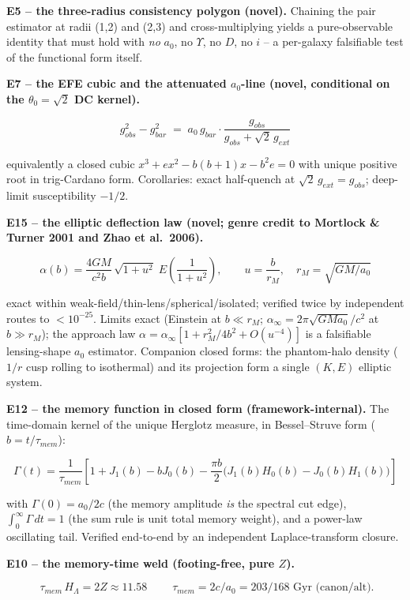 \documentclass[
]{article}
\begin{document}
\textbf{E5 -- the three-radius consistency polygon (novel).} Chaining
the pair estimator at radii (1,2) and (2,3) and cross-multiplying yields
a pure-observable identity that must hold with \emph{no} \(a_0\), no
\(\Upsilon\), no \(D\), no \(i\) -- a per-galaxy falsifiable test of the
functional form itself.

\textbf{E7 -- the EFE cubic and the attenuated \(a_0\)-line (novel,
conditional on the \(\theta_0 = \sqrt2\) DC kernel).}

\[ \boxed{\; g_{obs}^2 - g_{bar}^2 \;=\; a_0\, g_{bar} \cdot \frac{g_{obs}}{g_{obs} + \sqrt2\, g_{ext}} \;} \]

equivalently a closed cubic \(x^3 + e x^2 - b(b+1)x - b^2 e = 0\) with
unique positive root in trig-Cardano form. Corollaries: exact
half-quench at \(\sqrt2\, g_{ext} = g_{obs}\); deep-limit susceptibility
\(-1/2\).

\textbf{E15 -- the elliptic deflection law (novel; genre credit to
Mortlock \& Turner 2001 and Zhao et al.~2006).}

\[ \boxed{\; \alpha(b) = \frac{4GM}{c^2 b}\, \sqrt{1+u^2}\; E\!\left(\frac{1}{1+u^2}\right), \qquad u = \frac{b}{r_M}, \quad r_M = \sqrt{GM/a_0} \;} \]

exact within weak-field/thin-lens/spherical/isolated; verified twice by
independent routes to \(< 10^{-25}\). Limits exact (Einstein at
\(b \ll r_M\); \(\alpha_\infty = 2\pi\sqrt{GMa_0}/c^2\) at
\(b \gg r_M\)); the approach law
\(\alpha = \alpha_\infty[1 + r_M^2/4b^2 + O(u^{-4})]\) is a falsifiable
lensing-shape \(a_0\) estimator. Companion closed forms: the
phantom-halo density (\(1/r\) cusp rolling to isothermal) and its
projection form a single \((K, E)\) elliptic system.

\textbf{E12 -- the memory function in closed form (framework-internal).}
The time-domain kernel of the unique Herglotz measure, in Bessel--Struve
form (\(b = t/\tau_{mem}\)):

\[ \Gamma(t) = \frac{1}{\tau_{mem}}\left[ 1 + J_1(b) - b J_0(b) - \frac{\pi b}{2}\big(J_1(b)H_0(b) - J_0(b)H_1(b)\big) \right] \]

with \(\Gamma(0) = a_0/2c\) (the memory amplitude \emph{is} the spectral
cut edge), \(\int_0^\infty \Gamma\, dt = 1\) (the sum rule is unit total
memory weight), and a power-law oscillating tail. Verified end-to-end by
an independent Laplace-transform closure.

\textbf{E10 -- the memory-time weld (footing-free, pure \(Z\)).}

\[ \boxed{\; \tau_{mem}\, H_\Lambda = 2Z \approx 11.58 \;} \qquad \tau_{mem} = 2c/a_0 = 203 / 168 \text{ Gyr (canon/alt)}. \]
\end{document}
